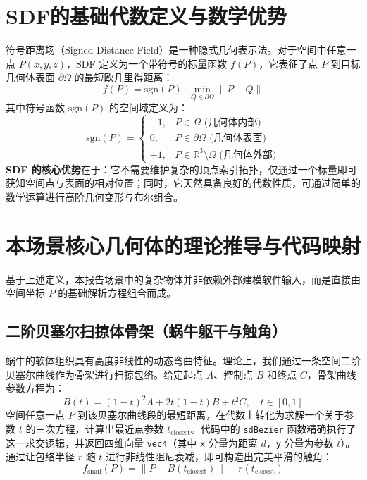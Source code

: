 \documentclass[11pt, a4paper, oneside]{report}
\newcommand{\keyword}[1]{\textbf{#1}}
\newcommand{\code}[1]{\texttt{#1}}
\begin{document}
\section{SDF的基础代数定义与数学优势}
符号距离场（Signed Distance Field）是一种隐式几何表示法。对于空间中任意一点 $P(x,y,z)$，SDF 定义为一个带符号的标量函数 $f(P)$，它表征了点 $P$ 到目标几何体表面 $\partial\Omega$ 的最短欧几里得距离：
\begin{equation}
f(P) = \text{sgn}(P) \cdot \min_{Q \in \partial \Omega} \|P - Q\|
\end{equation}
其中符号函数 $\text{sgn}(P)$ 的空间域定义为：
\begin{equation}
\text{sgn}(P) = 
\begin{cases} 
-1, & P \in \Omega \text{ (几何体内部)} \\
0,  & P \in \partial\Omega \text{ (几何体表面)} \\
+1, & P \in \mathbb{R}^3 \setminus \bar{\Omega} \text{ (几何体外部)}
\end{cases}
\end{equation}
\keyword{SDF 的核心优势}在于：它不需要维护复杂的顶点索引拓扑，仅通过一个标量即可获知空间点与表面的相对位置；同时，它天然具备良好的代数性质，可通过简单的数学运算进行高阶几何变形与布尔组合。

\section{本场景核心几何体的理论推导与代码映射}
基于上述定义，本报告场景中的复杂物体并非依赖外部建模软件输入，而是直接由空间坐标 $P$ 的基础解析方程组合而成。

\subsection{ 二阶贝塞尔扫掠体骨架（蜗牛躯干与触角）}
蜗牛的软体组织具有高度非线性的动态弯曲特征。理论上，我们通过一条空间二阶贝塞尔曲线作为骨架进行扫掠包络。给定起点 $A$、控制点 $B$ 和终点 $C$，骨架曲线参数方程为：
\begin{equation}
B(t) = (1-t)^2 A + 2t(1-t) B + t^2 C, \quad t \in [0,1]
\end{equation}
空间任意一点 $P$ 到该贝塞尔曲线段的最短距离，在代数上转化为求解一个关于参数 $t$ 的三次方程，计算出最近点参数 $t_{\text{closest}}$。代码中的 \code{sdBezier} 函数精确执行了这一求交逻辑，并返回四维向量 \code{vec4}（其中 \code{x} 分量为距离 $d$，\code{y} 分量为参数 $t$）。通过让包络半径 $r$ 随 $t$ 进行非线性阻尼衰减，即可构造出完美平滑的触角：
\begin{equation}
f_{\text{snail}}(P) = \|P - B(t_{\text{closest}})\| - r(t_{\text{closest}})
\end{equation}
\end{document}
